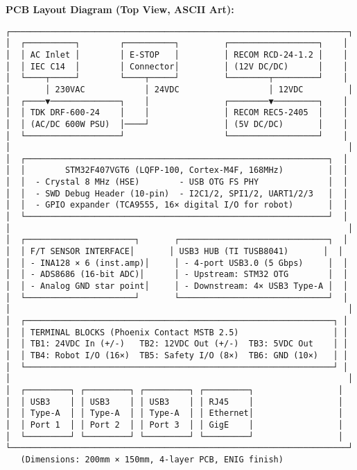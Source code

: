 \documentclass[
]{article}
\begin{document}
\textbf{PCB Layout Diagram (Top View, ASCII Art):}

\begin{verbatim}
┌────────────────────────────────────────────────────────────────────┐
│  ┌──────────┐        ┌──────────┐         ┌──────────────────┐    │
│  │ AC Inlet │        │ E-STOP   │         │ RECOM RCD-24-1.2 │    │
│  │ IEC C14  │        │ Connector│         │ (12V DC/DC)      │    │
│  └────┬─────┘        └────┬─────┘         └────────┬─────────┘    │
│       │ 230VAC            │ 24VDC                  │ 12VDC         │
│  ┌────▼──────────────┐    │               ┌────────▼─────────┐    │
│  │ TDK DRF-600-24    │    │               │ RECOM REC5-2405  │    │
│  │ (AC/DC 600W PSU)  │────┘               │ (5V DC/DC)       │    │
│  └───────────────────┘                    └──────────────────┘    │
│                                                                    │
│  ┌─────────────────────────────────────────────────────────────┐  │
│  │        STM32F407VGT6 (LQFP-100, Cortex-M4F, 168MHz)         │  │
│  │  - Crystal 8 MHz (HSE)        - USB OTG FS PHY              │  │
│  │  - SWD Debug Header (10-pin)  - I2C1/2, SPI1/2, UART1/2/3   │  │
│  │  - GPIO expander (TCA9555, 16× digital I/O for robot)       │  │
│  └─────────────────────────────────────────────────────────────┘  │
│                                                                    │
│  ┌──────────────────────┐       ┌──────────────────────────────┐  │
│  │ F/T SENSOR INTERFACE│       │ USB3 HUB (TI TUSB8041)       │  │
│  │ - INA128 × 6 (inst.amp)│     │ - 4-port USB3.0 (5 Gbps)     │  │
│  │ - ADS8686 (16-bit ADC)│      │ - Upstream: STM32 OTG        │  │
│  │ - Analog GND star point│     │ - Downstream: 4× USB3 Type-A │  │
│  └──────────────────────┘       └──────────────────────────────┘  │
│                                                                    │
│  ┌──────────────────────────────────────────────────────────────┐ │
│  │ TERMINAL BLOCKS (Phoenix Contact MSTB 2.5)                   │ │
│  │ TB1: 24VDC In (+/-)   TB2: 12VDC Out (+/-)  TB3: 5VDC Out    │ │
│  │ TB4: Robot I/O (16×)  TB5: Safety I/O (8×)  TB6: GND (10×)   │ │
│  └──────────────────────────────────────────────────────────────┘ │
│                                                                    │
│  ┌─────────┐ ┌─────────┐ ┌─────────┐ ┌─────────┐                 │
│  │ USB3    │ │ USB3    │ │ USB3    │ │ RJ45    │                 │
│  │ Type-A  │ │ Type-A  │ │ Type-A  │ │ Ethernet│                 │
│  │ Port 1  │ │ Port 2  │ │ Port 3  │ │ GigE    │                 │
│  └─────────┘ └─────────┘ └─────────┘ └─────────┘                 │
└────────────────────────────────────────────────────────────────────┘
   (Dimensions: 200mm × 150mm, 4-layer PCB, ENIG finish)
\end{verbatim}
\end{document}
